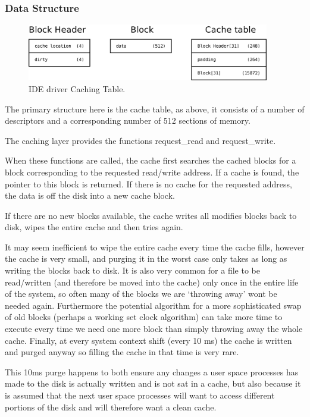 \documentclass[a4paper]{report}
\begin{document}
\subsubsection{Data Structure}


\begin{figure}[ht]
\centering
\includegraphics[width=400px]{images/Caching_Table}
\caption{IDE driver Caching Table.}
\label{fig:WinTitleBarScreen}
\end{figure}

The primary structure here is the cache table, as above, it consists of a number of descriptors and a corresponding number of 512 sections of memory.

The caching layer provides the functions request_read and request_write.

When these functions are called, the cache first searches the cached blocks for a block corresponding to the requested read/write address. If a cache is found, the pointer to this block is returned. If there is no cache for the requested address, the data is off the disk into a new cache block.

If there are no new blocks available, the cache writes all modifies blocks back to disk, wipes the entire cache and then tries again.

It may seem inefficient to wipe the entire cache every time the cache fills, however the cache is very small, and purging it in the worst case only takes as long as writing the blocks back to disk. It is also very common for a file to be read/written (and therefore be moved into the cache) only once in the entire life of the system, so often many of the blocks we are `throwing away' wont be needed again. Furthermore the potential algorithm for a more sophisticated swap of old blocks (perhaps a working set clock algorithm) can take more time to execute every time we need one more block than simply throwing away the whole cache. Finally, at every system context shift (every 10 ms) the cache is written and purged anyway so filling the cache in that time is very rare.

This 10ms purge happens to both ensure any changes a user space processes has made to the disk is actually written and is not sat in a cache, but also because it is assumed that the next user space processes will want to access different portions of the disk and will therefore want a clean cache.
\end{document}
